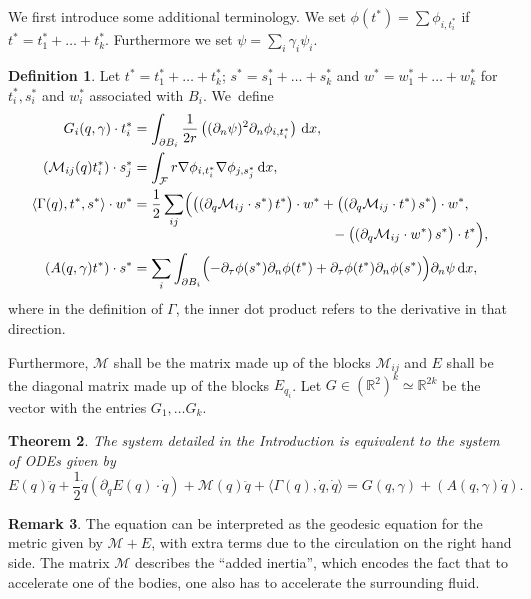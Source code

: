 \documentclass[10pt]{amsart}
\newtheorem{theorem}{Theorem}[subsection]
\theoremstyle{definition}
\newtheorem{definition}[theorem]{Definition}
\newtheorem{remark}[theorem]{Remark}
\newcommand\R{\mathbb{R}}
\newcommand\eq{=}
\newcommand\dd{\,\mathrm{d}}
\newcommand\dx{\dd x}
\let\de\partial
\begin{document}
We first introduce some additional terminology.
We set $\phi(t^*)=\sum \phi_{i,t_i^*}$ if $t^*=t_1^*+\dots+ t_k^*$. Furthermore we set $\psi=\sum_i\gamma_i\psi_i$.

\begin{definition}\label{main def}
Let $t^*=t_1^*+\dots+ t_k^*$; $s^*=s_1^*+\dots+ s_k^*$ and $w^*=w_1^*+\dots+w_k^*$ for $t_i^*,s_i^*$ and $w_i^*$ associated with $B_i$. We~define
\begin{align*}
G_i(q,\gamma)\cdot t_i^*&\eq\int_{\de B_i} \frac{1}{2r}\left((\de_n\psi)^2\de_n\phi_{i,t_i^*}\right)\dx,\\
(\mathcal{M}_{ij}(q)t_i^*)\cdot s_j^*&\eq\int_{\mathcal{F}}r\nabla\phi_{i,t_i^*}\nabla \phi_{j,s_j^*}\dx,\\
\langle \Gamma(q),t^*,s^*\rangle\cdot w^*&\eq \frac{1}{2}\sum_{ij}\Bigl( \bigl(\left(\de_q\mathcal{M}_{ij}\cdot s^*\right)t^*\bigr)\cdot w^*+\bigl(\left(\de_q\mathcal{M}_{ij}\cdot t^*\right)s^*\bigr)\cdot w^*,\\[-8pt]
&\hspace*{5cm}-\bigl(\left(\de_q\mathcal{M}_{ij}\cdot w^*\right)s^*\bigr)\cdot t^*\Bigr),\\
(A(q,\gamma)t^*)\cdot s^*&\eq\sum_i\int_{\de B_i}\Bigl(-\de_\tau\phi(s^*)\de_n\phi(t^*)+\de_\tau\phi(t^*)\de_n\phi(s^*)\Bigr)\de_n\psi\dx,
\end{align*}
where in the definition of $\Gamma$, the inner dot product refers to the derivative in that direction.

Furthermore, $\mathcal{M}$ shall be the matrix made up of the blocks $\mathcal{M}_{ij}$ and $E$ shall be the diagonal matrix made up of the blocks $E_{q_i}$. Let $G\in (\R^2)^k\simeq \R^{2k}$ be the vector with the entries $G_1,\dots G_k$.

\end{definition}

\begin{theorem}\label{ODEtheorem}
The system detailed in the Introduction is equivalent to the system of ODEs given by
\begin{equation}\label{MainODE}
E(q)\ddot{q}+\frac{1}{2}\dot{q}(\de_{q}E(q)\cdot\dot{q})+\mathcal{M}(q)\ddot{q}+\langle\Gamma(q),\dot{q},\dot{q}\rangle
\eq G(q,\gamma)+(A(q,\gamma)\dot{q}).
\end{equation}
\end{theorem}

\begin{remark}
The equation can be interpreted as the geodesic equation for the metric given by $\mathcal{M}+E$, with extra terms due to the circulation on the right hand side. The matrix $\mathcal{M}$ describes the ``added inertia'', which encodes the fact that to accelerate one of the bodies, one also has to accelerate the surrounding fluid.

\end{remark}
\end{document}
